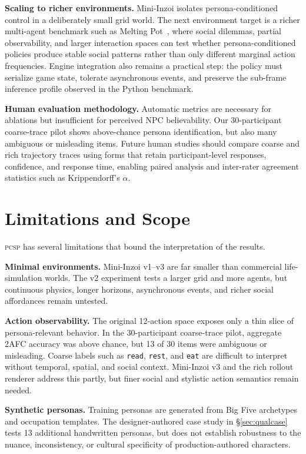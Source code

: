 \documentclass[conference]{IEEEtran}
\newcommand{\PCSP}{\textsc{pcsp}\xspace}
\begin{document}
\textbf{Scaling to richer environments.}
Mini-Inzoi isolates persona-conditioned control in a deliberately small grid
world. The next environment target is a richer multi-agent benchmark such as
Melting Pot~\cite{leibo2021meltingpot}, where social dilemmas, partial
observability, and larger interaction spaces can test whether persona-conditioned
policies produce stable social patterns rather than only different marginal
action frequencies. Engine integration also remains a practical step: the policy
must serialize game state, tolerate asynchronous events, and preserve the
sub-frame inference profile observed in the Python benchmark.

\textbf{Human evaluation methodology.}
Automatic metrics are necessary for ablations but insufficient for perceived NPC
believability. Our 30-participant coarse-trace pilot shows above-chance persona
identification, but also many ambiguous or misleading items. Future human
studies should compare coarse and rich trajectory traces using forms that retain
participant-level responses, confidence, and response time, enabling paired
analysis and inter-rater agreement statistics such as Krippendorff's $\alpha$.

\section{Limitations and Scope}
\label{sec:limits}

\PCSP has several limitations that bound the interpretation of the results.

\textbf{Minimal environments.}
Mini-Inzoi v1--v3 are far smaller than commercial life-simulation worlds.
The v2 experiment tests a larger grid and more agents, but continuous physics,
longer horizons, asynchronous events, and richer social affordances remain
untested.

\textbf{Action observability.}
The original 12-action space exposes only a thin slice of persona-relevant
behavior. In the 30-participant coarse-trace pilot, aggregate 2AFC accuracy was
above chance, but 13 of 30 items were ambiguous or misleading. Coarse labels
such as \texttt{read}, \texttt{rest}, and \texttt{eat} are difficult to
interpret without temporal, spatial, and social context. Mini-Inzoi v3 and the
rich rollout renderer address this partly, but finer social and stylistic
action semantics remain needed.

\textbf{Synthetic personas.}
Training personas are generated from Big Five archetypes and occupation
templates. The designer-authored case study in \S\ref{sec:qualcase} tests 13
additional handwritten personas, but does not establish robustness to the
nuance, inconsistency, or cultural specificity of production-authored
characters.
\end{document}
